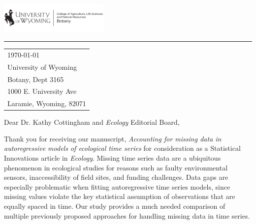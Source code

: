 \documentclass{article}
\begin{document}

\includegraphics[width=0.4\textwidth]{UWtwoline_H_Botany_black.png} %

\vspace{-1em} %

\rule{\linewidth}{1pt} %



\hfill
\begin{tabular}{l @{}}
	\today \\ %
	University of Wyoming\\
	Botany, Dept 3165\\
    1000 E. University Ave\\
    Laramie, Wyoming, 82071\\
\end{tabular}




\bigskip %

Dear Dr. Kathy Cottingham and \textit{Ecology} Editorial Board,

\mediumskip %



Thank you for receiving our manuscript, \textit{Accounting for missing data in autoregressive models of ecological time series} for consideration as a Statistical Innovations article in \textit{Ecology}. Missing time series data are a ubiquitous phenomenon in ecological studies for reasons such as faulty environmental sensors, inaccessibility of field sites, and funding challenges. Data gaps are especially problematic when fitting autoregressive time series models, since missing values violate the key statistical assumption of observations that are equally spaced in time. Our study provides a much needed comparison of multiple previously proposed approaches for handling missing data in time series. 
\end{document}
